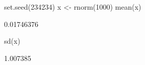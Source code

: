 \begin{Schunk}
\begin{Sinput}
 set.seed(234234)
 x <- rnorm(1000)
 mean(x)
\end{Sinput}
\begin{Soutput}
[1] 0.01746376
\end{Soutput}
\begin{Sinput}
 sd(x)
\end{Sinput}
\begin{Soutput}
[1] 1.007385
\end{Soutput}
\end{Schunk}
